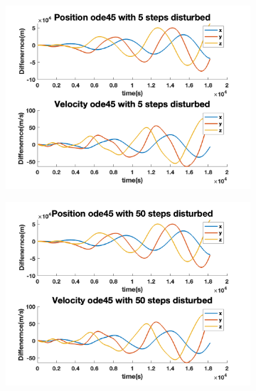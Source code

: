 \documentclass[12pt
,headinclude
,headsepline
,bibtotocnumbered
]{scrartcl}
\begin{document}
\begin{figure}[H]
\begin{subfigure}[b]{0.45\textwidth}
        \includegraphics[width=1\textwidth]{./plots/ode45_5_yprime_d.png}
        \end{subfigure}
        \begin{subfigure}[b]{0.45\textwidth}
        \includegraphics[width=1\textwidth]{./plots/ode45_50_yprime_d.png}
        \end{subfigure}
    \end{figure}
\end{document}
